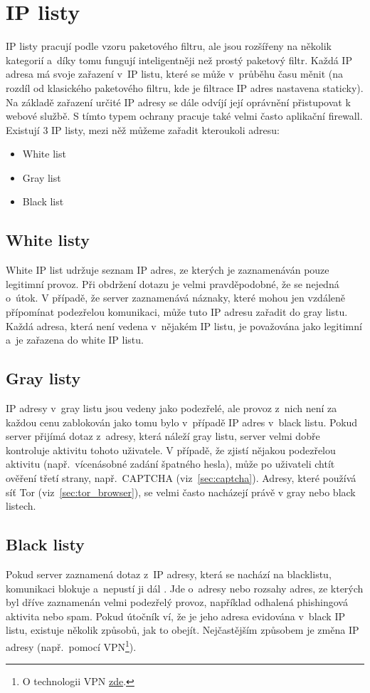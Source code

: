\section{IP listy}
\label{sec:ip_lists}
IP listy pracují podle vzoru paketového filtru, ale jsou rozšířeny na několik kategorií a~díky tomu fungují inteligentněji než prostý paketový filtr. Každá IP adresa má svoje zařazení v~IP listu, které se může v~průběhu času měnit (na rozdíl od klasického paketového filtru, kde je filtrace IP adres nastavena staticky). Na základě zařazení určité IP adresy se dále odvíjí její oprávnění přistupovat k webové službě. S tímto typem ochrany pracuje také velmi často aplikační firewall. Existují 3 IP listy, mezi něž můžeme zařadit kteroukoli adresu:
\begin{itemize}
	\item White list
	\item Gray list
	\item Black list
\end{itemize}

\subsection*{White listy}
White IP list udržuje seznam IP adres, ze kterých je zaznamenáván pouze legitimní provoz. Při obdržení dotazu je velmi pravděpodobné, že se nejedná o~útok. V případě, že server zaznamenává náznaky, které mohou jen vzdáleně přípomínat podezřelou komunikaci, může tuto IP adresu zařadit do gray listu. Každá adresa, která není vedena v~nějakém IP listu, je považována jako legitimní a~je zařazena do white IP listu.

\subsection*{Gray listy}
\label{sec:gray_list}
IP adresy v~gray listu jsou vedeny jako podezřelé, ale provoz z~nich není za každou cenu zablokován jako tomu bylo v~případě IP adres v~black listu. Pokud server přijímá dotaz z~adresy, která náleží gray listu, server velmi dobře kontroluje aktivitu tohoto uživatele. V případě, že zjistí nějakou podezřelou aktivitu (např.~vícenásobné zadání špatného hesla), může po uživateli chtít ověření třetí strany, např.~CAPTCHA (viz~\ref{sec:captcha}). Adresy, které používá síť Tor (viz~\ref{sec:tor_browser}), se velmi často nacházejí právě v gray nebo black listech.

\subsection*{Black listy}
Pokud server zaznamená dotaz z~IP adresy, která se nachází na blacklistu, komunikaci blokuje a~nepustí ji dál \cite{bib:black_list}. Jde o~adresy nebo rozsahy adres, ze kterých byl dříve zaznamenán velmi podezřelý provoz, například odhalená phishingová aktivita nebo spam. Pokud útočník ví, že je jeho adresa evidována v~black IP listu, existuje několik způsobů, jak to obejít. Nejčastějším způsobem je změna IP adresy (např.~pomocí VPN\footnote{O technologii VPN \href{https://blog.avast.com/cs/co-je-vpn-a-jak-funguje}{zde}.}).

